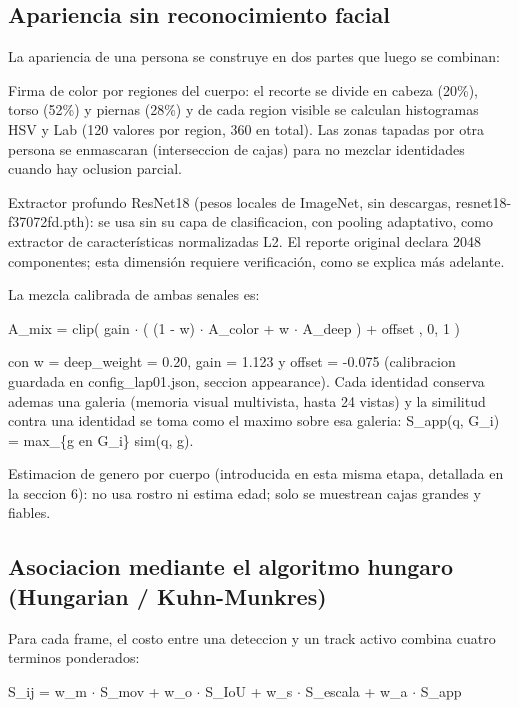 \documentclass[12pt,letterpaper]{article}
\begin{document}
\subsection{Apariencia sin reconocimiento facial}

La apariencia de una persona se construye en dos partes que luego se combinan:


Firma de color por regiones del cuerpo: el recorte se divide en cabeza (20\%), torso (52\%) y piernas (28\%) y de cada region visible se calculan histogramas HSV y Lab (120 valores por region, 360 en total). Las zonas tapadas por otra persona se enmascaran (interseccion de cajas) para no mezclar identidades cuando hay oclusion parcial.


Extractor profundo ResNet18 (pesos locales de ImageNet, sin descargas, resnet18-f37072fd.pth): se usa sin su capa de clasificacion, con pooling adaptativo, como extractor de características normalizadas L2. El reporte original declara 2048 componentes; esta dimensión requiere verificación, como se explica más adelante.


La mezcla calibrada de ambas senales es:


A\_\allowbreak mix = clip( gain $\cdot$ ( (1 - w) $\cdot$ A\_\allowbreak color + w $\cdot$ A\_\allowbreak deep ) + offset , 0, 1 )


con w = deep\_\allowbreak weight = 0.20, gain = 1.123 y offset = -0.075 (calibracion guardada en config\_\allowbreak lap01.json, seccion appearance). Cada identidad conserva ademas una galeria (memoria visual multivista, hasta 24 vistas) y la similitud contra una identidad se toma como el maximo sobre esa galeria: S\_\allowbreak app(q, G\_\allowbreak i) = max\_\allowbreak \{g en G\_\allowbreak i\} sim(q, g).


Estimacion de genero por cuerpo (introducida en esta misma etapa, detallada en la seccion 6): no usa rostro ni estima edad; solo se muestrean cajas grandes y fiables.


\subsection{Asociacion mediante el algoritmo hungaro (Hungarian / Kuhn-Munkres)}

Para cada frame, el costo entre una deteccion y un track activo combina cuatro terminos ponderados:


S\_\allowbreak ij = w\_\allowbreak m $\cdot$ S\_\allowbreak mov + w\_\allowbreak o $\cdot$ S\_\allowbreak IoU + w\_\allowbreak s $\cdot$ S\_\allowbreak escala + w\_\allowbreak a $\cdot$ S\_\allowbreak app
\end{document}
